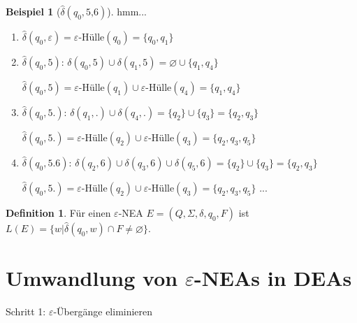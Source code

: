\documentclass[11pt]{article} %
\theoremstyle{definition}
\newtheorem*{beispiel}{Beispiel}
\newtheorem{definition}{Definition}
\begin{document}
\begin{beispiel}[$\hat\delta(q_0, \textrm{5,6})$] hmm...
\begin{enumerate}
\item $\hat\delta(q_0, \varepsilon) = \varepsilon$-Hülle$(q_0) = \{q_0, q_1 \}$
\item $\hat\delta(q_0, 5)$: $\delta(q_0, 5) \cup \delta(q_1, 5) = \varnothing \cup \{q_1, q_4\}$

$\hat\delta(q_0, 5) = \varepsilon$-Hülle$(q_1) \cup \varepsilon$-Hülle$(q_4) = \{q_1, q_4\}$

\item $\hat\delta(q_0, \textrm{5.})$: $\delta(q_1, \textrm{.}) \cup \delta(q_4, \textrm{.}) = \{q_2\} \cup \{q_3\}  = \{q_2, q_3\}$

$\hat\delta(q_0, \textrm{5.}) = \varepsilon$-Hülle$(q_2) \cup \varepsilon$-Hülle$(q_3) = \{q_2, q_3, q_5\}$

\item $\hat\delta(q_0, \textrm{5.6})$: $\delta(q_2, \textrm{6}) \cup \delta(q_3, \textrm{6}) \cup \delta(q_5, 6) = \{q_2\} \cup \{q_3\}  = \{q_2, q_3\}$

$\hat\delta(q_0, \textrm{5.}) = \varepsilon$-Hülle$(q_2) \cup \varepsilon$-Hülle$(q_3) = \{q_2, q_3, q_5\}$
...
\end{enumerate}
\end{beispiel}

\begin{definition}
Für einen $\varepsilon$-NEA $E = (Q, \Sigma, \delta, q_0, F)$ ist $L(E) = \{w | \hat\delta(q_0, w) \cap F \neq \varnothing\}$.
\end{definition}

\section{Umwandlung von $\varepsilon$-NEAs in DEAs}

Schritt 1: $\varepsilon$-Übergänge eliminieren
\end{document}
